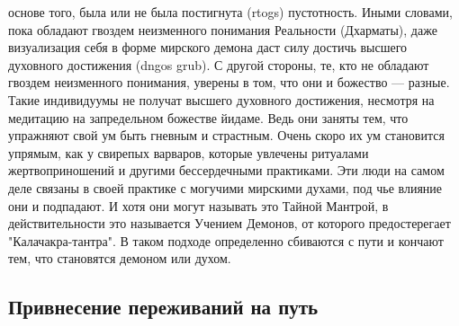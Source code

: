 \begin{siderules}
основе того, была или не была постигнута (rtogs) пустотность. Иными словами, пока
обладают гвоздем неизменного понимания Реальности (Дхарматы), даже визуализация себя в
форме мирского демона даст силу достичь высшего духовного достижения (dngos grub).
С другой стороны, те, кто не обладают гвоздем неизменного понимания, уверены в том, что
они и божество — разные. Такие индивидуумы не получат высшего духовного достижения,
несмотря на медитацию на запредельном божестве йидаме. Ведь они заняты тем, что
упражняют свой ум быть гневным и страстным. Очень скоро их ум становится упрямым, как
у свирепых варваров, которые увлечены ритуалами жертвоприношений и другими
бессердечными практиками. Эти люди на самом деле связаны в своей практике с могучими
мирскими духами, под чье влияние они и подпадают. И хотя они могут называть это Тайной
Мантрой, в действительности это называется Учением Демонов, от которого предостерегает
"Калачакра-тантра". В таком подходе определенно сбиваются с пути и кончают тем, что
становятся демоном или духом.
\end{siderules}

\subsection{Привнесение переживаний на путь}


